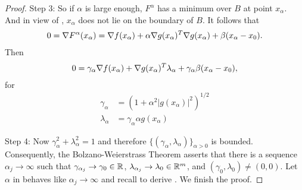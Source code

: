 \begin{proof}
Step 3: So if $\alpha$ is large enough, $F^\alpha$ has a minimum over $B$ at point $x_\alpha$.
And in view of , $x_\alpha$ does not lie on the boundary of $B$.
It follows that
\begin{align}
0 = \grad F^\alpha (x_\alpha) = \grad f(x_\alpha) + \alpha \grad g(x_\alpha)^T \grad g(x_\alpha) + \beta (x_\alpha - x_0).
\labeq{proof_FJcfvf_eq_6}
\end{align}
Then
\begin{align}
0 = \gamma_\alpha \grad f(x_\alpha) + \grad g(x_\alpha)^T \lambda_\alpha + \gamma_\alpha \beta (x_\alpha - x_0),
\labeq{proof_FJcfvf_eq_7}
\end{align}
for
\begin{align}
\gamma_\alpha  &= (1+\alpha^2|g(x_\alpha)|^2)^{1/2} \\
\lambda_\alpha &= \gamma_\alpha \alpha g(x_\alpha)
\end{align}

Step 4: Now $\gamma_\alpha^2 + \lambda_\alpha^2 = 1$ and therefore $\{(\gamma_\alpha, \lambda_\alpha)\}_{\alpha >0}$ is bounded.
Consequently, the Bolzano-Weierstrass Theorem asserts that there is a sequence $\alpha_j \to \infty$ such that $
\gamma_{\alpha_j} \to \gamma_0 \in \mathbb{R}$, $\lambda_{\alpha_j} \to \lambda_0 \in \mathbb{R}^m$, and $(\gamma_0, \lambda_0) \neq (0, 0)$.
Let $\alpha$ in  behaves like $\alpha_j \to \infty$ and recall  to derive .
We finish the proof.
\end{proof}


